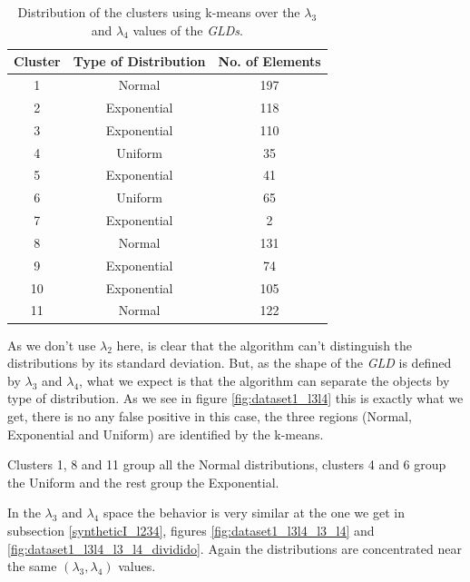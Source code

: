 \begin{table}[]
\centering
\caption{Distribution of the clusters using k-means over the $\lambda_{3}$ and $\lambda_{4}$ values of the \textit{GLDs}.}
\label{tab:dataset1_l3l4}
\begin{tabular}{|c|c|c|}
\hline
Cluster & Type of Distribution & No. of Elements \\ \hline
1       & Normal          & 197              \\ \hline
2       & Exponential          & 118              \\ \hline
3       & Exponential          & 110             \\ \hline
4       & Uniform               & 35              \\ \hline
5       & Exponential               & 41              \\ \hline
6       & Uniform               & 65             \\ \hline
7       & Exponential              & 2             \\ \hline
8       & Normal          & 131              \\ \hline
9       & Exponential          & 74               \\ \hline
10      & Exponential               & 105              \\ \hline
11      & Normal          & 122              \\ \hline
\end{tabular}
\end{table}
 
 
As we don't use $\lambda_{2}$ here, is clear that the algorithm can't distinguish the distributions by its standard deviation. But, as the shape of the \textit{GLD} is defined by $\lambda_{3}$ and $\lambda_{4}$, what we expect is that the algorithm can separate the objects by type of distribution. As we see in figure \ref{fig:dataset1_l3l4} this is exactly what we get, there is no any false positive in this case, the three regions (Normal, Exponential and Uniform) are identified by the k-means.

Clusters 1, 8 and 11 group all the Normal distributions, clusters 4 and 6 group the Uniform and the rest group the Exponential.

In the $\lambda_{3}$ and $\lambda_{4}$ space the behavior is very similar at the one we get in subsection \ref{syntheticI_l234}, figures \ref{fig:dataset1_l3l4_l3_l4} and \ref{fig:dataset1_l3l4_l3_l4_dividido}. Again the distributions are concentrated near the same $(\lambda_{3}, \lambda_{4})$ values.

